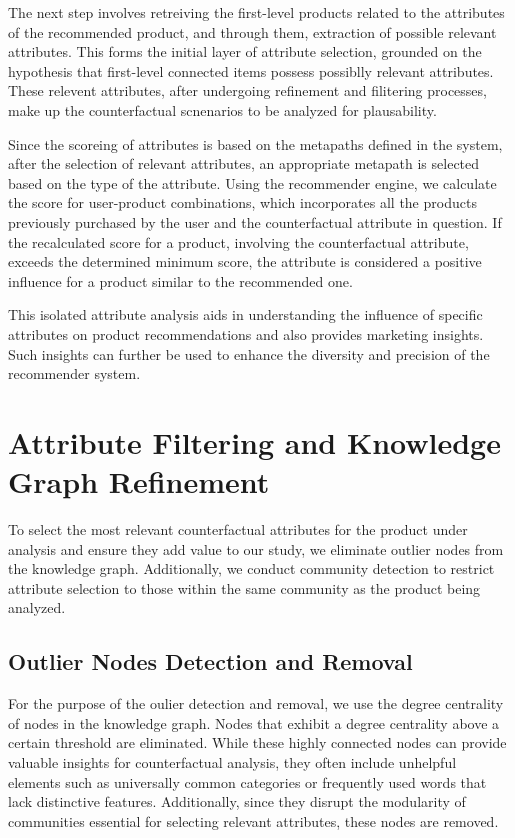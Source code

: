 The next step involves retreiving the first-level products related to the
attributes of the recommended product, and through them, extraction of possible
relevant attributes. This forms the initial layer of attribute selection,
grounded on the hypothesis that first-level connected items possess possiblly
relevant attributes. These relevent attributes, after undergoing refinement and filitering processes, 
make up the counterfactual scnenarios to be analyzed for plausability. 

Since the scoreing of attributes is based on the metapaths defined in the system,
after the selection of relevant attributes, an appropriate metapath is selected
based on the type of the attribute. Using the recommender engine, we calculate
the score for user-product combinations, which incorporates all the products previously
purchased by the user and the counterfactual attribute in question. If the
recalculated score for a product, involving the counterfactual attribute,
exceeds the determined minimum score, the attribute is considered a positive influence
for a product similar to the recommended one.

This isolated attribute analysis aids in understanding the influence of specific
attributes on product recommendations and also provides marketing insights. Such
insights can further be used to enhance the diversity and precision of the recommender
system.

\section{Attribute Filtering and Knowledge Graph Refinement}
To select the most relevant counterfactual attributes for the product under
analysis and ensure they add value to our study, we eliminate outlier nodes from
the knowledge graph. Additionally, we conduct community detection to restrict attribute
selection to those within the same community as the product being analyzed.

\subsection{Outlier Nodes Detection and Removal}
For the purpose of the oulier detection and removal, we use the degree centrality
of nodes in the knowledge graph. Nodes that exhibit a degree centrality above a
certain threshold are eliminated. While these highly connected nodes can provide
valuable insights for counterfactual analysis, they often include unhelpful
elements such as universally common categories or frequently used words that
lack distinctive features. Additionally, since they disrupt the modularity of
communities essential for selecting relevant attributes, these nodes are removed.

